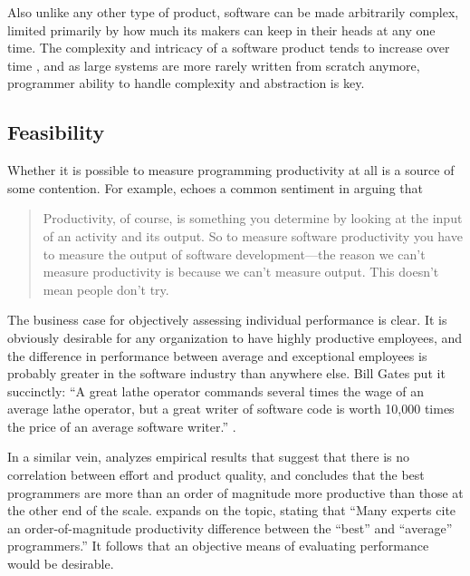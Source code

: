 \documentclass[letterpaper, 12pt]{report}
\begin{document}
Also unlike any other type of product, software can be made arbitrarily complex, limited primarily by how much its makers can keep in their heads at any one time. 
The complexity and intricacy of a software product tends to increase over time \parencite{veksler:truths}, and as large systems are more rarely written from scratch anymore, programmer ability to handle complexity and abstraction is key.



\subsection{Feasibility}
Whether it is possible to measure programming productivity at all is a source of some contention. For example, \textcite{fowler:cannotmeasure} echoes a common sentiment in arguing that
\begin{quote}
	Productivity, of course, is something you determine by looking at the input of an activity and its output. 
	So to measure software productivity you have to measure the output of software development---the reason we can't measure productivity is because we can't measure output. 
This doesn't mean people don't try. 
\end{quote}
The business case for objectively assessing individual performance is clear. 
It is obviously desirable for any organization to have highly productive employees, and the  difference in performance between average and exceptional employees is probably greater in the software industry than anywhere else.
Bill Gates put it succinctly:
``A great lathe operator commands several times the wage of an average lathe operator, but a great writer of software code is worth 10,000 times the price of an average software writer.'' \parencite{veksler:truths}. 

In a similar vein, \textcite{spolsky:high} analyzes empirical results that suggest that there is no correlation between effort and product quality, and concludes that the best programmers are more than an order of magnitude more productive than those at the other end of the scale. 
\textcite{martin:tenfinity} expands on the topic, stating that ``Many experts cite an order-of-magnitude productivity difference between the “best” and “average” programmers.''
It follows that an objective means of evaluating performance would be desirable. 
\end{document}
